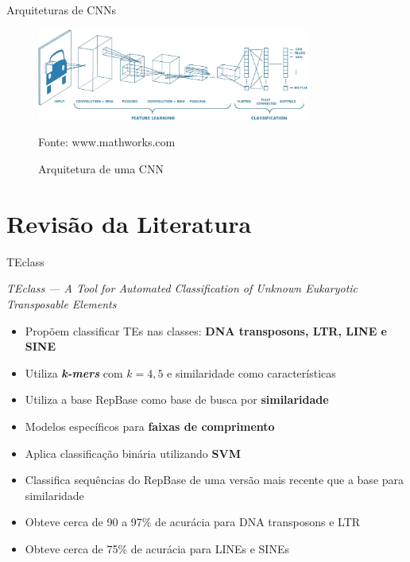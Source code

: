 \documentclass[%
  xcolor=table,%
  10pt,%
  aspectratio = 169,%
  compress,%
  t,%
]{beamer}%
\begin{document}
\begin{frame}{}{Arquiteturas de CNNs}
    \begin{figure}
        \centering
        \includegraphics[width=0.8\textwidth]{./Figuras/cnn-architecture.jpg}
        \caption{Arquitetura de uma CNN}
        \scriptsize Fonte: www.mathworks.com
    \end{figure}
\end{frame}
\section{Revisão da Literatura}\label{sec:revlit}

\begin{frame}{}{TEclass}
    \begin{block}{\textit{TEclass — A Tool for Automated Classification of Unknown Eukaryotic Transposable Elements}}
        \begin{itemize}
            \item Propõem classificar TEs nas classes: \textbf{DNA transposons, LTR, LINE e SINE}
            \item Utiliza \textbf{\textit{k-mers}} com $k={4,5}$ e similaridade como características
            \item Utiliza a base RepBase como base de busca por \textbf{similaridade}
            \item Modelos específicos para \textbf{faixas de comprimento}
            \item Aplica classificação binária utilizando \textbf{SVM} 
            \item Classifica sequências do RepBase de uma versão mais recente que a base para similaridade
            \item Obteve cerca de 90 a 97\% de acurácia para DNA transposons e LTR
            \item Obteve cerca de 75\% de acurácia para LINEs e SINEs
        \end{itemize}
    \end{block}
\end{frame}
\end{document}
